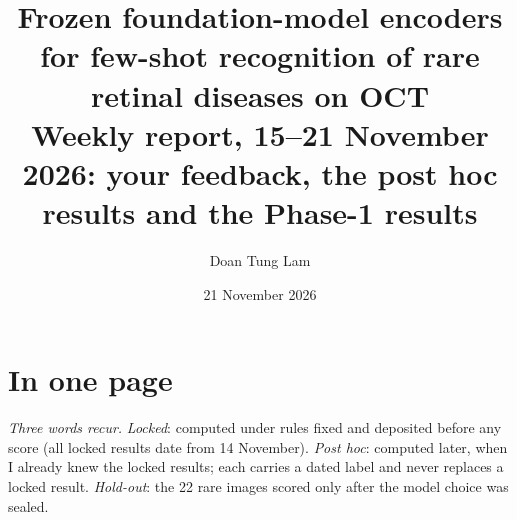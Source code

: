 \documentclass[10pt,a4paper]{article}
\title{\textbf{Frozen foundation-model encoders for few-shot recognition of rare retinal diseases on OCT}\\[2pt]
  \large Weekly report, 15--21 November 2026: your feedback, the post hoc results and the Phase-1 results}
\author{Doan Tung Lam}
\date{21 November 2026}
\begin{document}
\maketitle

\section*{In one page}

\noindent\emph{Three words recur.} \emph{Locked}: computed under rules fixed and deposited before any score
(all locked results date from 14 November). \emph{Post hoc}: computed later, when I already knew the locked
results; each carries a dated label and never replaces a locked result. \emph{Hold-out}: the 22 rare images
scored only after the model choice was sealed.
\end{document}
